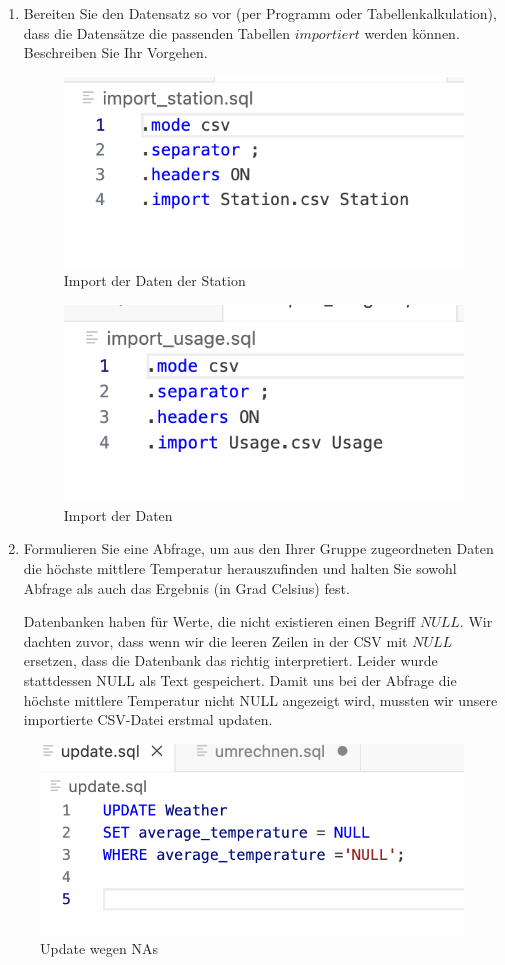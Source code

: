 \documentclass{article}
\begin{document}
\begin{enumerate}
\item Bereiten Sie den Datensatz so vor (per Programm oder Tabellenkalkulation), dass die Datensätze die passenden Tabellen $importiert$ werden können. Beschreiben Sie Ihr Vorgehen.

\begin{figure}[h]
    \centering
    \includegraphics[width=0.5\linewidth]{import_station.png}
    \caption{Import der Daten der Station}
    \label{fig:enter-label}
\end{figure}

\begin{figure}[h]
    \centering
    \includegraphics[width=0.5\linewidth]{import_usage.png}
    \caption{Import der Daten}
    \label{fig:enter-label}
\end{figure}

\item Formulieren Sie eine Abfrage, um aus den Ihrer Gruppe zugeordneten Daten die höchste mittlere Temperatur herauszufinden und halten Sie sowohl Abfrage als auch das Ergebnis (in Grad Celsius) fest. 

Datenbanken haben für Werte, die nicht existieren einen Begriff $NULL$. Wir dachten zuvor, dass wenn wir die leeren Zeilen in der CSV mit $NULL$ ersetzen, dass die Datenbank das richtig interpretiert. Leider wurde stattdessen NULL als Text gespeichert. Damit uns bei der Abfrage die höchste mittlere Temperatur nicht NULL angezeigt wird, mussten wir unsere importierte CSV-Datei erstmal updaten.
\end{enumerate}  
\begin{figure} [h]
    \centering
    \includegraphics[width=0.5\linewidth]{update NAs.png}
    \caption{Update wegen NAs}
    \label{fig:enter-label}
\end{figure}
\end{document}
